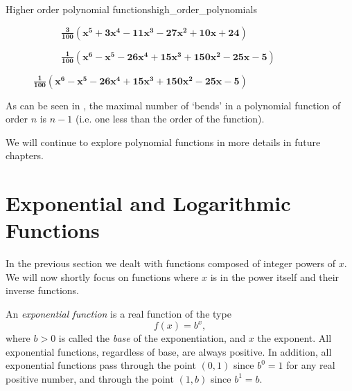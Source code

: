 \begin{example}{Higher order polynomial functions}{high_order_polynomials}
\begin{figure}[H]
		\begin{subfigure}[b]{0.475\textwidth}
			\centering
			\caption{\textcolor{xgreen}{$\bm{\frac{3}{100}\left( x^{5}+3x^{4}-11x^{3}-27x^{2}+10x+24 \right)}$}}
		\end{subfigure}
		\hfill
		\begin{subfigure}[b]{0.475\textwidth}
			\centering
			\caption{\textcolor{xpurple}{$\bm{\frac{1}{100}\left( x^{6}-x^{5}-26x^{4}+15x^{3}+150x^{2}-25x-5\right)}$}}
		\end{subfigure}
	\end{figure}
\end{example}

As can be seen in , the maximal number of `bends' in a polynomial function of order $n$ is $n-1$ (i.e. one less than the order of the function).

We will continue to explore polynomial functions in more details in future chapters.

\section{Exponential and Logarithmic Functions}
In the previous section we dealt with functions composed of integer powers of $x$. We will now shortly focus on functions where $x$ is in the power itself and their inverse functions.

An \emph{exponential function} is a real function of the type
\begin{equation}
	f(x) = b^{x},
	\label{eq:exponent}
\end{equation}
where $b>0$ is called the \emph{base} of the exponentiation, and $x$ the exponent. All exponential functions, regardless of base, are always positive. In addition, all exponential functions pass through the point $(0,1)$ since $b^{0}=1$ for any real positive number, and through the point $(1,b)$ since $b^{1}=b$.

